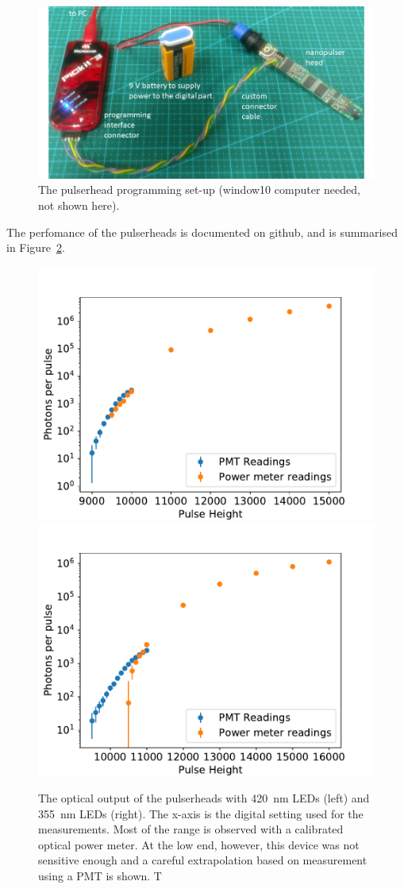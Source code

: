 \begin{figure}
\begin{center}	
  \includegraphics[width=1.0\linewidth]{figures/pulserhead_programming.jpg}
  \caption{The pulserhead programming set-up (window10 computer needed, not shown here).}
  \label{figure:pulserhead_programming}
\end{center}
\end{figure}

The perfomance of the pulserheads is documented on github\cite{GITHUB_TEST}, and is summarised in Figure~\ref{figure:pulserhead_output}.

\begin{figure}
\begin{center}	
  \includegraphics[width=0.48\linewidth]{figures/PhotonCounts420nm.pdf}
  \includegraphics[width=0.48\linewidth]{figures/PhotonCounts355nm.pdf}
  \caption{The optical output of the pulserheads with 420~nm LEDs (left) and 355~nm LEDs (right). The x-axis is the digital setting used for the measurements. Most of the range is observed with a calibrated optical power meter. At the low end, however, this device was not sensitive enough and a careful extrapolation based on measurement using a PMT is shown. T}
  \label{figure:pulserhead_output}
\end{center}
\end{figure}

